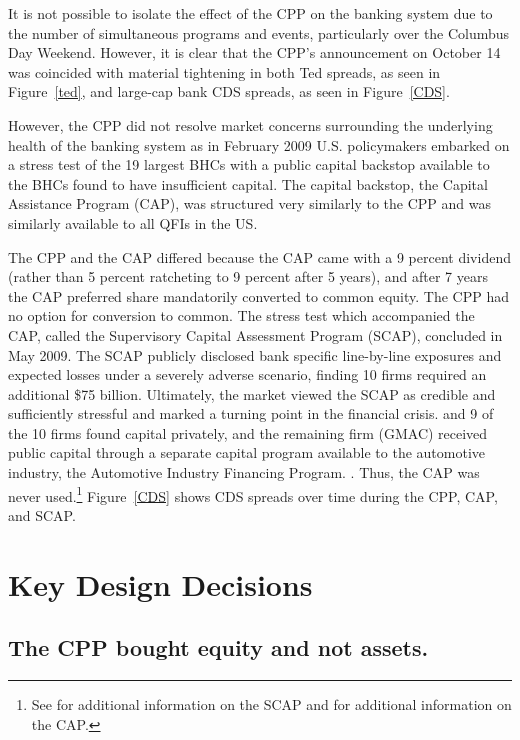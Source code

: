 \documentclass[12pt]{article}
\begin{document}
It is not possible to isolate the effect of the CPP on the banking system due to the number of simultaneous programs and events, particularly over the Columbus Day Weekend. However, it is clear that the CPP's announcement on October 14 was coincided with material tightening in both Ted spreads, as seen in Figure~\ref{ted}, and large-cap bank CDS spreads, as seen in Figure~\ref{CDS}. 

However, the CPP did not resolve market concerns surrounding the underlying health of the banking system as in February 2009 U.S. policymakers embarked on a stress test of the 19 largest BHCs with a public capital backstop available to the BHCs found to have insufficient capital. The capital backstop, the Capital Assistance Program (CAP), was structured very similarly to the CPP and was similarly available to all QFIs in the US. 

The CPP and the CAP differed because the CAP came with a 9 percent dividend (rather than 5 percent ratcheting to 9 percent after 5 years), and after 7 years the CAP preferred share mandatorily converted to common equity. The CPP had no option for conversion to common. The stress test which accompanied the CAP, called the Supervisory Capital Assessment Program (SCAP), concluded in May 2009. The SCAP publicly disclosed bank specific line-by-line exposures and expected losses under a severely adverse scenario, finding 10 firms required an additional \$75 billion. Ultimately, the market viewed the SCAP as credible and sufficiently stressful and marked a turning point in the financial crisis. \citep{Bernanke} and \citep{Geithner} 9 of the 10 firms found capital privately, and the remaining firm (GMAC) received public capital through a separate capital program available to the automotive industry, the Automotive Industry Financing Program. \citep{Ross2016a}. Thus, the CAP was never used.\footnote{See \citet{Ross2016a} for additional information on the SCAP and \citet{Ross2016b} for additional information on the CAP.} Figure~\ref{CDS} shows CDS spreads over time during the CPP, CAP, and SCAP.

\newpage
\section{Key Design Decisions}

\subsection{The CPP bought equity and not assets.}
\end{document}

